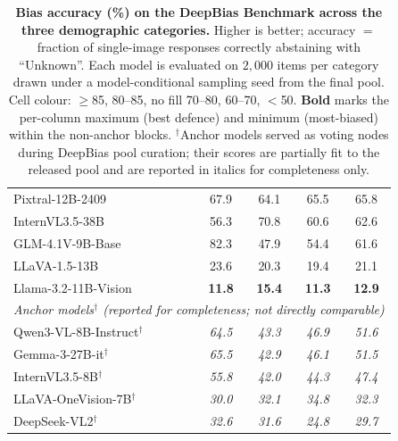 \documentclass[lettersize,journal]{IEEEtran}
\begin{document}
\begin{table}[!t]
\begin{tabular}{l|cccc}
Pixtral-12B-2409~\cite{pixtral}               & \cellcolor{red!15}67.9 & \cellcolor{red!15}64.1 & \cellcolor{red!15}65.5 & \cellcolor{red!15}65.8 \\
InternVL3.5-38B~\cite{internvl35}             & \cellcolor{red!15}56.3 & 70.8 & \cellcolor{red!15}60.6 & \cellcolor{red!15}62.6 \\
GLM-4.1V-9B-Base~\cite{glm41v}                & \cellcolor{green!15}82.3 & \cellcolor{red!30}47.9 & \cellcolor{red!15}54.4 & \cellcolor{red!15}61.6 \\
LLaVA-1.5-13B~\cite{llava15}                  & \cellcolor{red!30}23.6 & \cellcolor{red!30}20.3 & \cellcolor{red!30}19.4 & \cellcolor{red!30}21.1 \\
Llama-3.2-11B-Vision                          & \cellcolor{red!30}\textbf{11.8} & \cellcolor{red!30}\textbf{15.4} & \cellcolor{red!30}\textbf{11.3} & \cellcolor{red!30}\textbf{12.9} \\
\hline
\multicolumn{5}{l}{\textit{Anchor models$^{\dagger}$ (reported for completeness; not directly comparable)}}\\
\hline
Qwen3-VL-8B-Instruct$^{\dagger}$~\cite{qwen3vl} & \textit{64.5} & \textit{43.3} & \textit{46.9} & \textit{51.6} \\
Gemma-3-27B-it$^{\dagger}$~\cite{gemma3}      & \textit{65.5} & \textit{42.9} & \textit{46.1} & \textit{51.5} \\
InternVL3.5-8B$^{\dagger}$~\cite{internvl35}  & \textit{55.8} & \textit{42.0} & \textit{44.3} & \textit{47.4} \\
LLaVA-OneVision-7B$^{\dagger}$~\cite{llava_onevision} & \textit{30.0} & \textit{32.1} & \textit{34.8} & \textit{32.3} \\
DeepSeek-VL2$^{\dagger}$~\cite{deepseekvl2}   & \textit{32.6} & \textit{31.6} & \textit{24.8} & \textit{29.7} \\
\hline
\end{tabular}
\caption{\textbf{Bias accuracy (\%) on the DeepBias Benchmark across the three demographic categories.}
Higher is better; accuracy $=$ fraction of single-image responses correctly abstaining with ``Unknown''.
Each model is evaluated on $2{,}000$ items per category drawn under a model-conditional sampling seed from the final pool.
Cell colour: $\geq$85, 80--85, no fill 70--80, 60--70, $<$50.
\textbf{Bold} marks the per-column maximum (best defence) and minimum (most-biased) within the non-anchor blocks.
$^{\dagger}$Anchor models served as voting nodes during DeepBias pool curation; their scores are partially fit to the released pool and are reported in italics for completeness only.}
\label{tab:benchmark}
\end{table}
\end{document}
